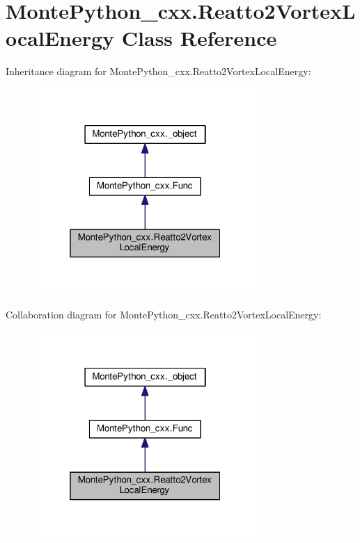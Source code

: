 \hypertarget{classMontePython__cxx_1_1Reatto2VortexLocalEnergy}{}\section{Monte\+Python\+\_\+cxx.\+Reatto2\+Vortex\+Local\+Energy Class Reference}
\label{classMontePython__cxx_1_1Reatto2VortexLocalEnergy}


Inheritance diagram for Monte\+Python\+\_\+cxx.\+Reatto2\+Vortex\+Local\+Energy\+:
\nopagebreak
\begin{figure}[H]
\begin{center}
\leavevmode
\includegraphics[width=241pt]{classMontePython__cxx_1_1Reatto2VortexLocalEnergy__inherit__graph}
\end{center}
\end{figure}


Collaboration diagram for Monte\+Python\+\_\+cxx.\+Reatto2\+Vortex\+Local\+Energy\+:
\nopagebreak
\begin{figure}[H]
\begin{center}
\leavevmode
\includegraphics[width=241pt]{classMontePython__cxx_1_1Reatto2VortexLocalEnergy__coll__graph}
\end{center}
\end{figure}
